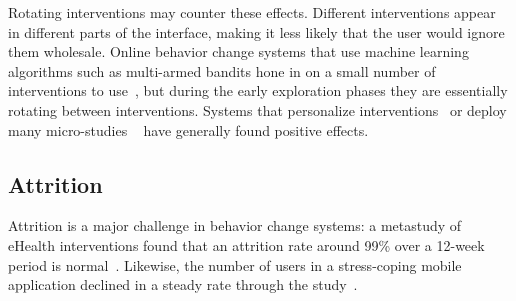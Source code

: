 Rotating interventions may counter these effects.
Different interventions appear in different parts of the interface, making it less likely that the user would ignore them wholesale.
Online behavior change systems that use machine learning algorithms such as multi-armed bandits hone in on a small number of interventions to use~\cite{paredes2014poptherapy, rabbi2014automated}, but during the early exploration phases they are essentially rotating between interventions. %
Systems that personalize interventions~\cite{kaptein2015personalizing} or deploy many micro-studies%
~\cite{doi:10.1111/j.1740-9713.2015.00863.x}
have generally found positive effects.




\subsection{Attrition}

Attrition is a major challenge in behavior change systems: a metastudy of eHealth interventions found that an attrition rate around 99\% over a 12-week period is normal~\cite{eysenbach2005law}. %
Likewise, the number of users in a stress-coping mobile application declined in a steady rate through the study~\cite{paredes2014poptherapy}. 

